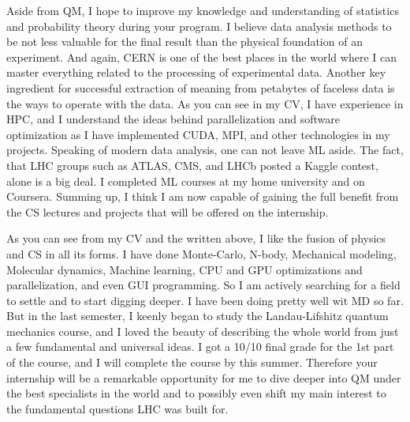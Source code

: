 \documentclass[12pt, a4paper]{awesome-cv}
\begin{document}
\begin{cvletter}
Aside from QM, I hope to improve my knowledge and understanding of statistics and probability theory during your program. I believe data analysis methods to be not less valuable for the final result than the physical foundation of an experiment. And again, CERN is one of the best places in the world where I can master everything related to the processing of experimental data. Another key ingredient for successful extraction of meaning from petabytes of faceless data is the ways to operate with the data. As you can see in my CV, I have experience in HPC, and I understand the ideas behind parallelization and software optimization as I have implemented CUDA, MPI, and other technologies in my projects. Speaking of modern data analysis, one can not leave ML aside. The fact, that LHC groups such as ATLAS, CMS, and LHCb posted a Kaggle contest, alone is a big deal. I completed ML courses at my home university and on Coursera. Summing up, I think I am now capable of gaining the full benefit from the CS lectures and projects that will be offered on the internship.


\newpage

As you can see from my CV and the written above, I like the fusion of physics and CS in all its forms. I have done Monte-Carlo, N-body, Mechanical modeling, Molecular dynamics, Machine learning, CPU and GPU optimizations and parallelization, and even GUI programming. So I am actively searching for a field to settle and to start digging deeper. I have been doing pretty well wit MD so far. But in the last semester, I keenly began to study the Landau-Lifshitz quantum mechanics course, and I loved the beauty of describing the whole world from just a few fundamental and universal ideas. I got a 10/10 final grade for the 1st part of the course, and I will complete the course by this summer. Therefore your internship will be a remarkable opportunity for me to dive deeper into QM under the best specialists in the world and to possibly even shift my main interest to the fundamental questions LHC was built for. 


\end{cvletter}
\end{document}

